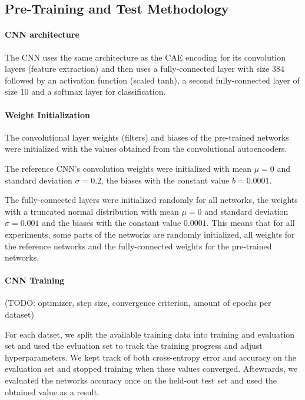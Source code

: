 \documentclass[draft]{article}
\begin{document}
  \subsection{Pre-Training and Test Methodology}

    \paragraph{CNN architecture} The CNN uses the same architecture as the CAE encoding for its convolution layers (feature extraction) and then uses a fully-connected layer with size 384 followed by an activation function (scaled tanh), a second fully-connected layer of size 10 and a softmax layer for classification. 

    \paragraph{Weight Initialization}

    The convolutional layer weights (filters) and biases of the pre-trained networks were initialized with the values obtained from the convolutional autoencoders.

    The reference CNN's convolution weights were initialized with mean $\mu = 0 $ and standard deviation $\sigma = 0.2$, the biases with the constant value $b =  0.0001$.

    The fully-connected layers were initialized randomly for all networks, the weights with a truncated normal distribution with mean $\mu = 0$ and standard deviation $\sigma = 0.001$ and the biases with the constant value $0.0001$.
    This means that for all experiments, some parts of the networks are randomly initialized, all weights for the reference networks and the fully-connected weights for the pre-trained networks. 

    \paragraph{CNN Training}
    (TODO: optimizer, step size, convergence criterion, amount of epochs per dataset)

    For each datset, we split the available training data into training and evaluation set and used the evluation set to track the training progress and adjust hyperparameters. We kept track of both cross-entropy error and accuracy on the evaluation set and stopped training when these values converged. Aftewrards, we evaluated the networks accuracy once on the held-out test set and used the obtained value as a result. 
\end{document}
